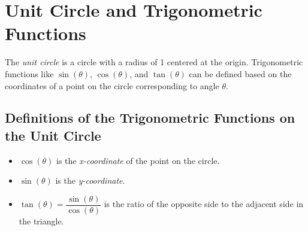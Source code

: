 \section{Unit Circle and Trigonometric Functions}

The \emph{unit circle} is a circle with a radius of 1 centered at the origin. Trigonometric functions like 
\(\sin(\theta)\), \(\cos(\theta)\), and \(\tan(\theta)\) can be defined based on the coordinates of a 
point on the circle corresponding to angle \(\theta\).

\begin{center}
\end{center}

\subsection{Definitions of the Trigonometric Functions on the Unit Circle}

\begin{itemize}

    \item \(\cos(\theta)\) is the \emph{x-coordinate} of the point on the circle.

    \item \(\sin(\theta)\) is the \emph{y-coordinate}.

    \item \(\tan(\theta) = \dfrac{\sin(\theta)}{\cos(\theta)}\) is the ratio of the opposite side to 
          the adjacent side in the triangle.

\end{itemize}


